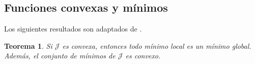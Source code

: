 \documentclass[12pt]{book}
\newtheorem{theorem}{Teorema}
\theoremstyle{definition}
\theoremstyle{plain}
\theoremstyle{remark}
\begin{document}


\subsection{Funciones convexas y mínimos}

Los siguientes resultados son adaptados de \cite{allaire2007}.


\begin{theorem}
Si $\mathcal{J}$ es convexa, entonces todo mínimo local es un mínimo global. Además, el conjunto de mínimos de $\mathcal{J}$ es convexo.
\end{theorem}
\end{document}
